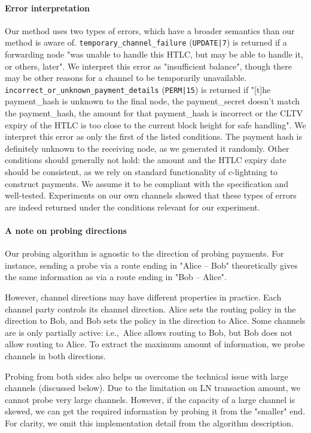 \paragraph{Error interpretation}
Our method uses two types of errors, which have a broader semantics than our method is aware of.
\texttt{temporary\_channel\_failure} (\texttt{UPDATE|7}) is returned if a forwarding node "was unable to handle this HTLC, but may be able to handle it, or others, later".
We interpret this error as "insufficient balance", though there may be other reasons for a channel to be temporarily unavailable.
\texttt{incorrect\_or\_unknown\_payment\_details} (\texttt{PERM|15}) is returned if "[t]he payment\_hash is unknown to the final node, the payment\_secret doesn't match the payment\_hash, the amount for that payment\_hash is incorrect or the CLTV expiry of the HTLC is too close to the current block height for safe handling".
We interpret this error as only the first of the listed conditions.
The payment hash is definitely unknown to the receiving node, as we generated it randomly.
Other conditions should generally not hold: the amount and the HTLC expiry date should be consistent, as we rely on standard functionality of c-lightning to construct payments.
We assume it to be compliant with the specification and well-tested.
Experiments on our own channels showed that these types of errors are indeed returned under the conditions relevant for our experiment.

\paragraph{A note on probing directions}
Our probing algorithm is agnostic to the direction of probing payments.
For instance, sending a probe via a route ending in "Alice -- Bob" theoretically gives the same information as via a route ending in "Bob -- Alice".

However, channel directions may have different properties in practice.
Each channel party controls its channel direction.
Alice sets the routing policy in the direction to Bob, and Bob sets the policy in the direction to Alice.
Some channels are is only partially active: i.e.,~Alice allows routing to Bob, but Bob does not allow routing to Alice.
To extract the maximum amount of information, we probe channels in both directions.

Probing from both sides also helps us overcome the technical issue with large channels (discussed below).
Due to the limitation on LN transaction amount, we cannot probe very large channels.
However, if the capacity of a large channel is skewed, we can get the required information by probing it from the "smaller" end.
For clarity, we omit this implementation detail from the algorithm description.

